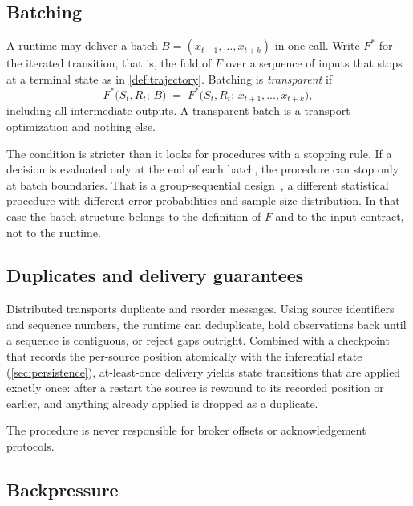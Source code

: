 \documentclass[11pt,a4paper]{article}
\theoremstyle{definition}
\theoremstyle{remark}
\begin{document}
\subsection{Batching}
\label{sec:batching}

A runtime may deliver a batch $B=(x_{t+1},\ldots,x_{t+k})$ in one call.
Write $F^{*}$ for the iterated transition, that is, the fold of $F$ over
a sequence of inputs that stops at a terminal state as in
\cref{def:trajectory}. Batching is \emph{transparent} if
\begin{equation}
F^{*}\bigl(S_t,R_t;\,B\bigr)
\;=\;
F^{*}\bigl(S_t,R_t;\,x_{t+1},\ldots,x_{t+k}\bigr),
\label{eq:batch}
\end{equation}
including all intermediate outputs. A transparent batch is a transport
optimization and nothing else.

The condition is stricter than it looks for procedures with a stopping
rule. If a decision is evaluated only at the end of each batch, the
procedure can stop only at batch boundaries. That is a group-sequential
design~\cite{jennison2000}, a different statistical procedure with
different error probabilities and sample-size distribution. In that case
the batch structure belongs to the definition of $F$ and to the input
contract, not to the runtime.

\subsection{Duplicates and delivery guarantees}
\label{sec:delivery}

Distributed transports duplicate and reorder messages. Using source
identifiers and sequence numbers, the runtime can deduplicate, hold
observations back until a sequence is contiguous, or reject gaps
outright. Combined with a checkpoint that records the per-source
position atomically with the inferential state
(\cref{sec:persistence}), at-least-once delivery yields state
transitions that are applied exactly once: after a restart the source is
rewound to its recorded position or earlier, and anything already
applied is dropped as a duplicate.

The procedure is never responsible for broker offsets or
acknowledgement protocols.

\subsection{Backpressure}
\end{document}

